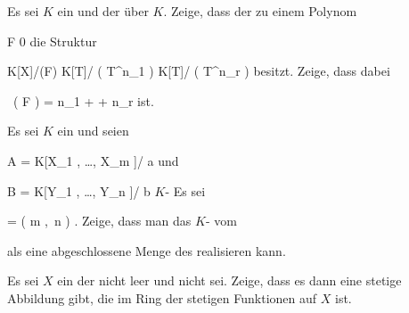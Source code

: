 {}
{





Es sei $K$ ein
und
 der
über $K$. Zeige, dass der
zu einem Polynom

\mavergleichskette
{\vergleichskette
{F
}
{ \neq }{ 0
}
{  }{
}
{    }{
}
{   }{
}
}
{}{}{}
die Struktur

\mavergleichskettedisp
{\vergleichskette
{K[X]/(F)
}
{ \cong} { K[T]/ \left(  T^{n_1 }  \right) \times \cdots \times  K[T]/ \left(  T^{n_r}  \right)
}
{ } {
}
{ } {
}
{ } {
}
}
{}{}{}
besitzt. Zeige, dass dabei

\mavergleichskettedisp
{\vergleichskette
{  \, ( F )
}
{ =} { n_1 + \cdots + n_r
}
{ } {
}
{ } {
}
{ } {
}
}
{}{}{}
ist.





}
{} {}

{}
{





Es sei $K$ ein
und seien

\mavergleichskette
{\vergleichskette
{ A
}
{ = }{ K[X_1  , \ldots , X_m ]/ {\mathfrak a}
}
{  }{
}
{    }{
}
{   }{
}
}
{}{}{}
und

\mavergleichskette
{\vergleichskette
{ B
}
{ = }{ K[Y_1 , \ldots , Y_n ]/ {\mathfrak b}
}
{  }{
}
{    }{
}
{   }{
}
}
{}{}{}
$K$-
Es sei

\mavergleichskettedisp
{\vergleichskette
{  \ell
}
{ =} {   \left( m ,\,  n \right)
}
{ } {
}
{ } {
}
{ } {
}
}
{}{}{.}
Zeige, dass man das
$K$-
vom

 als eine abgeschlossene Menge des
 realisieren kann.





}
{} {}

{}
{





Es sei $X$ ein
der nicht leer und nicht 
sei. Zeige, dass es dann eine stetige Abbildung
 {} {}
gibt, die
im Ring der stetigen Funktionen auf $X$ ist.





}
{} {}

